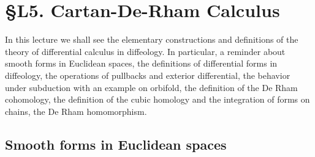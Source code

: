 
\chapter*{\S L5. Cartan-De-Rham Calculus}
\setcounter{footnote}{0}

\begin{abstract}
  This lecture is about the crucial theory of differential calculus,
  also called Cartan calculus.
  It is accompanied with the description of the De Rham Cohomology and its principal properties.
\end{abstract}


In this lecture we shall see the elementary constructions and definitions of the theory of differential calculus in diffeology.
In particular,
a reminder about smooth forms in Euclidean spaces,
the definitions of differential forms in diffeology,
the operations of pullbacks and exterior differential,
the behavior under subduction with an example on orbifold,
the definition of the De Rham cohomology,
the definition of the cubic homology and the integration of forms on chains,
the De Rham homomorphism.

\section{Smooth forms in Euclidean spaces}

